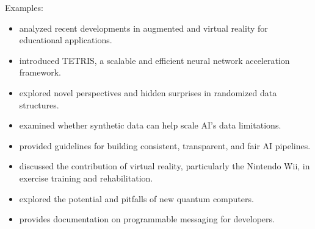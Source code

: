 \documentclass[10pt,twocolumn]{article}
\begin{document}
Examples:
\begin{itemize}
    \item \textcite{AlAnsiAnalyzingAugmented2023} analyzed recent developments in augmented and virtual reality for educational applications.\\
    \item
    \textcite{GaoTetris2017} introduced TETRIS, a scalable and efficient neural network acceleration framework.\\
    \item
    \textcite{KuszmaulRandomizedDataStructures2023} explored novel perspectives and hidden surprises in randomized data structures.\\
    \item
    \textcite{BoultonSyntheticData2025} examined whether synthetic data can help scale AI's data limitations.\\
    \item
    \textcite{PruksachatkunTrustworthyML} provided guidelines for building consistent, transparent, and fair AI pipelines.\\
    \item
    \textcite{HiragaNintendoWiiExercise2024} discussed the contribution of virtual reality, particularly the Nintendo Wii, in exercise training and rehabilitation.\\
    \item
    \textcite{YoutubeQuantumComputers2024} explored the potential and pitfalls of new quantum computers.\\
    \item
    \textcite{TwilioTechDocs} provides documentation on programmable messaging for developers.
\end{itemize}

\printbibliography
\end{document}
